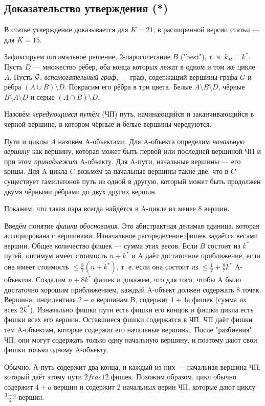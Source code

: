 \subsection{Доказательство утверждения (*)}
В статье \cite{BK06} утверждение доказывается для $K=21$, в расширенной версии статьи --- для $K=15$.
\begin{proofstar}
Зафиксируем оптимальное решение, 2-паросочетание $B$ ("best"), т. ч. $k_B = k^*$. Пусть $D$ --- множество рёбер, оба конца которых лежат в одном и том же цикле $A$. Пусть $\mathcal{G}$, \textit{вспомогательный граф}, --- граф, содержащий вершины графа $G$ и рёбра $(A \cup B) \setminus D$. Покрасим его рёбра в три цвета.
Белые $A \setminus B \setminus D$, чёрные $B \setminus A \setminus D$ и серые $(A \cap B) \setminus D$. 

Назовём \textit{чередующимся путём} (ЧП) путь, начинающийся и заканчивающийся в чёрной вершине, в котором чёрные и белые вершины чередуются.

Пути и циклы $A$ назовём A-объектами. Для A-объекта определим \textit{начальную вершину} как вершину, которая может быть первой или последней вершиной ЧП и при этом \textit{принадлежит} A-объекту. Для A-пути, начальные вершины --- его концы. Для A-цикла $C$ возьмём за начальные вершины такие две, что в $C$ существует гамильтонов путь из одной в другую, который может быть продолжен двумя чёрными рёбрами до двух других вершин. 

Покажем, что такая пара всегда найдётся в A-цикле из менее 8 вершин.

Введём понятие \textit{фишки обоснования}. Это абистрактная делимая единица, которая ассоциирована с вершинами. Изначальное распределение фишек задаётся весами вершин. Общее количество фишек --- сумма этих весов.
Если $B$ состоит из $k^*$ путей, оптимум имеет стоимость $n+k^*$ и A даёт достаточное приближение, если она имеет стоимость $\le \frac{8}{7}(n+k^*)$, т. е. если она состоит из $\le \frac{1}{7} + \frac{8}{7}k^*$ A-объектов. Создадим $n+8k^*$ фишек и докажем, что для того, чтобы A было достаточно хорошим приближением, каждый A-объект должен содержать 8 точек.
Вершина, инцидентная $2-a$ вершинам B, содержит $1+4а$ фишек (сумма их всех $2k^*$). Изначально фишки пути есть фишки его концов и фишки цикла есть фишки всех его вершин. Оставшиеся фишки содержатся в ЧП. ЧП даёт фишки тем A-объектам, которые содержат его начальные вершины. После "разбиения" ЧП, они могут содержать только одну начальную вершину, и поэтому дают свои фишки только одному A-объекту.

Обычно, А-путь содержит два конца, и каждый из них --- начальная вершина ЧП, который даёт этому пути $2
frac{1}{2}$ фишек. Похожим образом, цикл обычно содержит $4+a$ вершин и содержит 2 начальных верин ЧП, которые дают циклу $\frac{3-a}{2}$ вершин. 


\end{proofstar}
